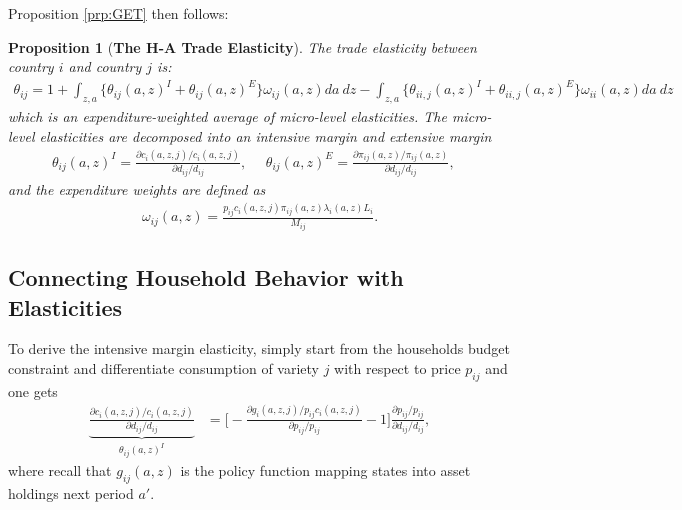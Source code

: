 \documentclass[12pt,pdftex]{article}
\newtheorem{prp}{Proposition}
\begin{document}
\begin{onehalfspacing}
Proposition \ref{prp:GET} then follows:

\setcounter{prp}{2}
\begin{prp}[\textbf{The H-A Trade Elasticity}]The trade elasticity between country $i$ and country $j$ is:
{\footnotesize
\begin{align}
\theta_{ij} = 1 + \int_{z,a} \bigg \{ \theta_{ij}(a,z)^{I} + \theta_{ij}(a,z)^{E} \bigg \}\omega_{ij}(a,z)da \ dz - \int_{z,a} \bigg \{ \theta_{ii,j}(a,z)^{I} + \theta_{ii,j}(a,z)^{E} \bigg \}\omega_{ii}(a,z)da \ dz
\label{eq:trade-elasticity}
\end{align}
}which is an expenditure-weighted average of micro-level elasticities. The micro-level elasticities are decomposed into an intensive margin and extensive margin
{\footnotesize
\begin{align}
\nonumber
\theta_{ij}(a,z)^{I} = \frac{\partial c_{i}(a,z,j)/ c_{i}(a,z,j)}{\partial d_{ij} / d_{ij}}, \ \ \ \ \ \ \theta_{ij}(a,z)^{E} = \frac{\partial \pi_{ij}(a,z) / \pi_{ij}(a,z)}{\partial d_{ij} / d_{ij}}, \ \ \ \
\end{align}
}
and the expenditure weights are defined as
{\footnotesize
\begin{align}
\nonumber
\omega_{ij}(a,z) = \frac{p_{ij}c_{i}(a,z,j)\pi_{ij}(a,z) \lambda_{i}(a,z) L_i}{M_{ij}}.
\end{align}
}
\end{prp}

\subsection{Connecting Household Behavior with Elasticities}

To derive the intensive margin elasticity, simply start from the households budget constraint and differentiate consumption of variety $j$ with respect to price $p_{ij}$ and one gets
\begin{align}
\underbrace{\frac{\partial c_{i}(a,z,j)/ c_{i}(a,z,j)}{\partial d_{ij} / d_{ij}}}_{\theta_{ij}(a,z)^{I}} &= \bigg [-\frac{\partial g_{i}(a,z,j)/ p_{ij}c_{i}(a,z,j)}{\partial p_{ij}/ p_{ij}} - 1 \bigg ]\frac{\partial p_{ij}/p_{ij}}{\partial d_{ij}/ d_{ij}} ,
\label{eq:apx-intensive-margin}
\end{align}
where recall that $g_{ij}(a,z)$ is the policy function mapping states into asset holdings next period $a'$.


\end{onehalfspacing}
\end{document}
